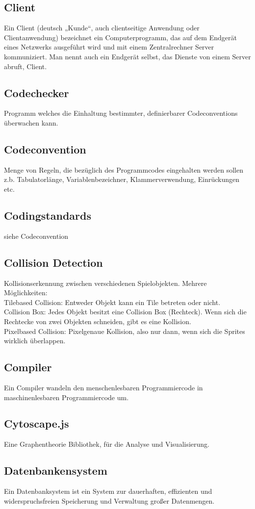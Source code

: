 \documentclass[11pt,a4paper]{article}
\begin{document}
\subsection{Client}
Ein Client (deutsch „Kunde“, auch clientseitige Anwendung oder Clientanwendung) bezeichnet ein Computerprogramm, das auf dem Endgerät eines Netzwerks ausgeführt wird und mit einem Zentralrechner Server kommuniziert. Man nennt auch ein Endgerät selbst, das Dienste von einem Server abruft, Client.
\subsection{Codechecker}
 Programm welches die Einhaltung bestimmter, definierbarer Codeconventions überwachen kann.
\subsection{Codeconvention}
Menge von Regeln, die bezüglich des Programmcodes eingehalten werden sollen z.b. Tabulatorlänge, Variablenbezeichner, Klammerverwendung, Einrückungen etc.
\subsection{Codingstandards}
siehe Codeconvention
\subsection{Collision Detection}
Kollisionserkennung zwischen verschiedenen Spielobjekten. Mehrere Möglichkeiten: \\
Tilebased Collision: Entweder Objekt kann ein Tile betreten oder nicht. \\
Collision Box: Jedes Objekt besitzt eine Collision Box (Rechteck). Wenn sich die Rechtecke von zwei Objekten schneiden, gibt es eine Kollision.\\
Pixelbased Collision: Pixelgenaue Kollision, also nur dann, wenn sich die Sprites wirklich überlappen.
\subsection{Compiler}
Ein Compiler wandeln  den menschenlesbaren Programmiercode in maschinenlesbaren Programmiercode um.
\subsection{Cytoscape.js}
Eine Graphentheorie Bibliothek, für die Analyse und Visualisierung.
\subsection{Datenbankensystem}
Ein Datenbanksystem ist ein  System zur dauerhaften, effizienten und widerspruchsfreien Speicherung  und Verwaltung großer Datenmengen.
\end{document}
